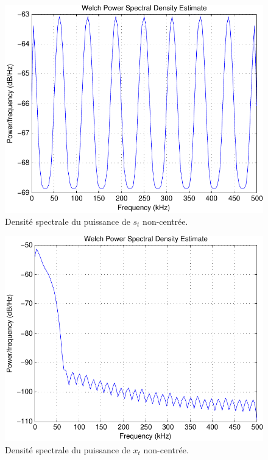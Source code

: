 \documentclass[a4paper,11pt]{article}
\begin{document}
\begin{figure}
	\begin{center}
	\includegraphics[scale=1]{welch_s_t_noncentree-crop.pdf}
	\caption{Densité spectrale du puissance de $s_t$ non-centrée.}
	\label{fig:ques5_Q4st}
	\end{center}
\end{figure} 

\begin{figure}
	\begin{center}
	\includegraphics[scale=1]{welch_x_t_noncentree-crop.pdf}
	\caption{Densité spectrale du puissance de $x_t$ non-centrée.}
	\label{fig:ques5_Q4xt}
	\end{center}
\end{figure}
\end{document}
